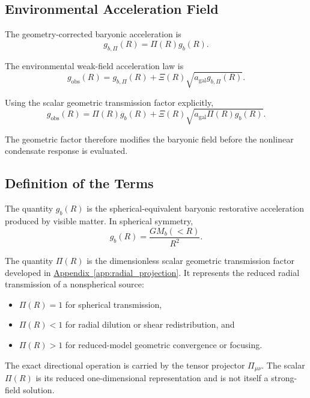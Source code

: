 \subsection{Environmental Acceleration Field}

The geometry-corrected baryonic acceleration is
\begin{equation}
    g_{b,\Pi}(R) = \Pi(R)g_b(R).
\end{equation}

The environmental weak-field acceleration law is
\begin{equation}
    g_{\mathrm{obs}}(R) = g_{b,\Pi}(R) + \Xi(R) \sqrt{ a_{\mathrm{gal}}g_{b,\Pi}(R) }.
\end{equation}

Using the scalar geometric transmission factor explicitly,
\begin{equation}
    g_{\mathrm{obs}}(R) = \Pi(R)g_b(R) + \Xi(R) \sqrt{ a_{\mathrm{gal}}\Pi(R)g_b(R) }.
\end{equation}

The geometric factor therefore modifies the baryonic field before the nonlinear condensate response is evaluated.

\subsection{Definition of the Terms}

The quantity $g_b(R)$ is the spherical-equivalent baryonic restorative acceleration produced by visible matter. In spherical symmetry,
\begin{equation}
    g_b(R) = \frac{GM_b(<R)}{R^2}.
\end{equation}

The quantity $\Pi(R)$ is the dimensionless scalar geometric transmission factor developed in \hyperref[app:radial_projection]{Appendix~\ref*{app:radial_projection}}. It represents the reduced radial transmission of a nonspherical source:
\begin{itemize}
    \item $\Pi(R)=1$ for spherical transmission,
    \item $\Pi(R)<1$ for radial dilution or shear redistribution, and
    \item $\Pi(R)>1$ for reduced-model geometric convergence or focusing.
\end{itemize}

The exact directional operation is carried by the tensor projector $\Pi_{\mu\nu}$. The scalar $\Pi(R)$ is its reduced one-dimensional representation and is not itself a strong-field solution.

